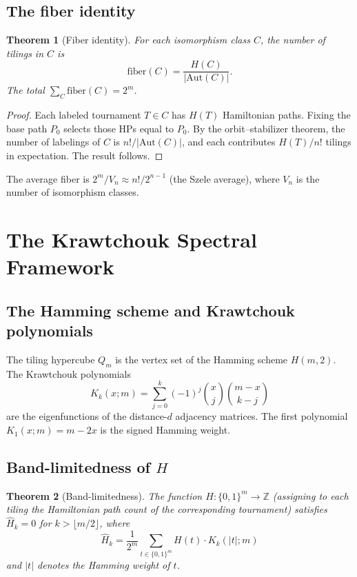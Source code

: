 \documentclass[11pt,a4paper]{article}
\newtheorem{theorem}{Theorem}[section]
\theoremstyle{definition}
\theoremstyle{remark}
\newcommand{\Aut}{\mathrm{Aut}}
\begin{document}
\subsection{The fiber identity}

\begin{theorem}[Fiber identity]
\label{thm:fiber}
For each isomorphism class $C$, the number of tilings in $C$ is
\[
\mathrm{fiber}(C) = \frac{H(C)}{|\Aut(C)|}.
\]
The total $\sum_C \mathrm{fiber}(C) = 2^m$.
\end{theorem}

\begin{proof}
Each labeled tournament $T \in C$ has $H(T)$ Hamiltonian paths. Fixing the base path $P_0$ selects those HPs equal to $P_0$. By the orbit--stabilizer theorem, the number of labelings of $C$ is $n!/|\Aut(C)|$, and each contributes $H(T)/n!$ tilings in expectation. The result follows.
\end{proof}

The average fiber is $2^m / V_n \approx n! / 2^{n-1}$ (the Szele average), where $V_n$ is the number of isomorphism classes.

\section{The Krawtchouk Spectral Framework}
\label{sec:krawtchouk}

\subsection{The Hamming scheme and Krawtchouk polynomials}

The tiling hypercube $Q_m$ is the vertex set of the Hamming scheme $H(m, 2)$. The Krawtchouk polynomials
\[
K_k(x; m) = \sum_{j=0}^{k} (-1)^j \binom{x}{j} \binom{m-x}{k-j}
\]
are the eigenfunctions of the distance-$d$ adjacency matrices. The first polynomial $K_1(x; m) = m - 2x$ is the signed Hamming weight.

\subsection{Band-limitedness of $H$}

\begin{theorem}[Band-limitedness]
\label{thm:bandlimited}
The function $H: \{0,1\}^m \to \mathbb{Z}$ (assigning to each tiling the Hamiltonian path count of the corresponding tournament) satisfies $\hat{H}_k = 0$ for $k > \lfloor m/2 \rfloor$, where
\[
\hat{H}_k = \frac{1}{2^m} \sum_{t \in \{0,1\}^m} H(t) \cdot K_k(|t|; m)
\]
and $|t|$ denotes the Hamming weight of $t$.
\end{theorem}
\end{document}

